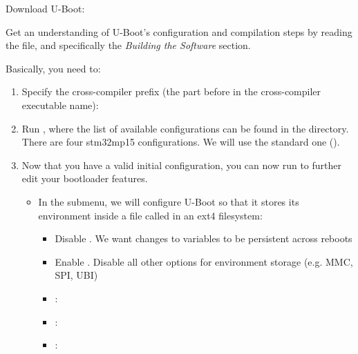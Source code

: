 Download U-Boot:


Get an understanding of U-Boot's configuration and compilation steps
by reading the  file, and specifically the {\em Building
the Software} section.

Basically, you need to:

\begin{enumerate}

\item Specify the cross-compiler prefix
(the part before  in the cross-compiler executable name):

\item Run , where the list of available
  configurations can be found in the  directory. There
  are four stm32mp15 configurations. We will use the standard one
  ().

\item Now that you have a valid initial configuration, you can now
  run  to further edit your bootloader features.
  \begin{itemize}

  \item In the  submenu, we will configure U-Boot so
    that it stores its environment inside a file called 
    in an ext4 filesystem:
    \begin{itemize}
    \item Disable . We want changes to variables to
        be persistent across reboots
    \item Enable . Disable all other
        options for environment storage (e.g. MMC, SPI, UBI)
    \item {}: 
    \item {}: 
    \item {}: 
    \end{itemize}


\end{itemize}
\end{enumerate}
